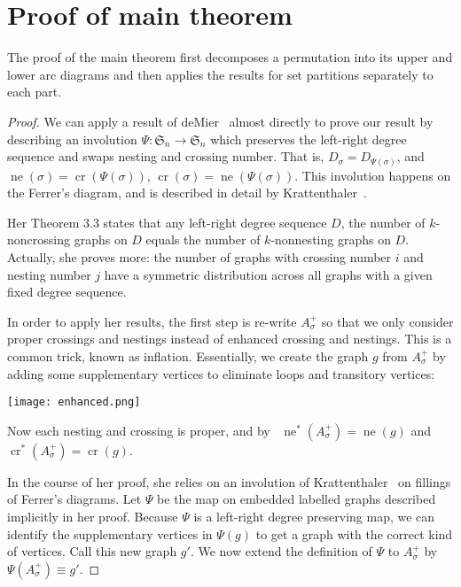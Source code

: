 \documentclass{amsart}
\begin{document}
\section{Proof of main theorem}
The proof of the main theorem first decomposes a permutation into its upper and lower arc diagrams and then applies the results for set partitions separately to each part. 

\begin{proof}
We can apply a result of deMier~\cite[Theorem 3.3]{deMi07} almost directly to prove our result by describing an involution $\Psi:{\mathfrak{S}_n}\rightarrow{\mathfrak{S}_n}$ which preserves the left-right degree sequence and swaps nesting and crossing number. That is, $D_\sigma=D_{\Psi(\sigma)}$, and ${\operatorname{ne}}(\sigma)={\operatorname{cr}}(\Psi(\sigma))$, ${\operatorname{cr}}(\sigma)={\operatorname{ne}}(\Psi(\sigma))$. This involution happens on the Ferrer's diagram, and is described in detail by Krattenthaler~\cite{Kratt06}.  

Her Theorem 3.3 states that any left-right degree sequence $D$, the number of $k$- 
noncrossing graphs on $D$ equals the number of $k$-nonnesting graphs on $D$. Actually,  she proves more: the number of graphs with crossing number $i$ and nesting number $j$ have a symmetric distribution across all graphs with a given fixed degree sequence. 

In order to apply her results, the first step is re-write $A_\sigma^+$ so that we only consider proper crossings and nestings instead of enhanced crossing and nestings. This is a common trick, known as inflation. Essentially, we create the graph $g$ from $A_\sigma^+$ by adding some supplementary vertices to eliminate loops and transitory vertices:\\
\begin{center}
\texttt{[image: enhanced.png]}
\end{center}

Now each nesting and crossing is proper, and by~\cite[Lemma 3.4]{deMi07} ${\operatorname{ne}}^*(A_\sigma^+)={\operatorname{ne}}(g)$ and ${\operatorname{cr}}^*(A_\sigma^+)={\operatorname{cr}}(g)$. 

In the course of her proof, she relies on an involution of Krattenthaler~\cite{Kratt06} on fillings of Ferrer's diagrams. Let $\Psi$ be the map on embedded labelled graphs described implicitly in her proof. Because $\Psi$ is a left-right degree preserving map, we can identify the supplementary vertices in $\Psi(g)$ to get a graph with the correct kind of vertices. Call this new graph $g'$. We now extend the definition of $\Psi$ to $A_\sigma^+$ by $\Psi(A_\sigma^+)\equiv g'.$


\end{proof}
\end{document}

